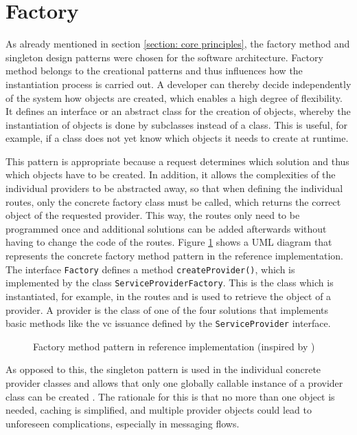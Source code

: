     \section{Factory}
    
    As already mentioned in section \ref{section: core principles}, the factory method and singleton design patterns were chosen for the software architecture. Factory method belongs to the creational patterns and thus influences how the instantiation process is carried out. A developer can thereby decide independently of the system how objects are created, which enables a high degree of flexibility. It defines an interface or an abstract class for the creation of objects, whereby the instantiation of objects is done by subclasses instead of a class. This is useful, for example, if a class does not yet know which objects it needs to create at runtime. \cite[pp. 81, 85, 107-108]{gamma_design_1995} 
    
    This pattern is appropriate because a request determines which solution and thus which objects have to be created. In addition, it allows the complexities of the individual providers to be abstracted away, so that when defining the individual routes, only the concrete factory class must be called, which returns the correct object of the requested provider. This way, the routes only need to be programmed once and additional solutions can be added afterwards without having to change the code of the routes. Figure \ref{figure: factory method} shows a UML diagram that represents the concrete factory method pattern in the reference implementation. The interface \texttt{Factory} defines a method \texttt{createProvider()}, which is implemented by the class \texttt{ServiceProviderFactory}. This is the class which is instantiated, for example, in the routes and is used to retrieve the object of a provider. A provider is the class of one of the four solutions that implements basic methods like the \ac{vc} issuance defined by the \texttt{ServiceProvider} interface.
    
    \begin{figure}[ht]
	    \centering    	    \makebox[\textwidth]{}
        \caption[Factory method pattern in reference implementation]{Factory method pattern in reference implementation (inspired by \cite[p. 107]{gamma_design_1995})}
        \label{figure: factory method}
    \end{figure}
    
    As opposed to this, the singleton pattern is used in the individual concrete provider classes and allows that only one globally callable instance of a provider class can be created \cite[p. 127]{gamma_design_1995}. The rationale for this is that no more than one object is needed, caching is simplified, and multiple provider objects could lead to unforeseen complications, especially in messaging flows. 
    
